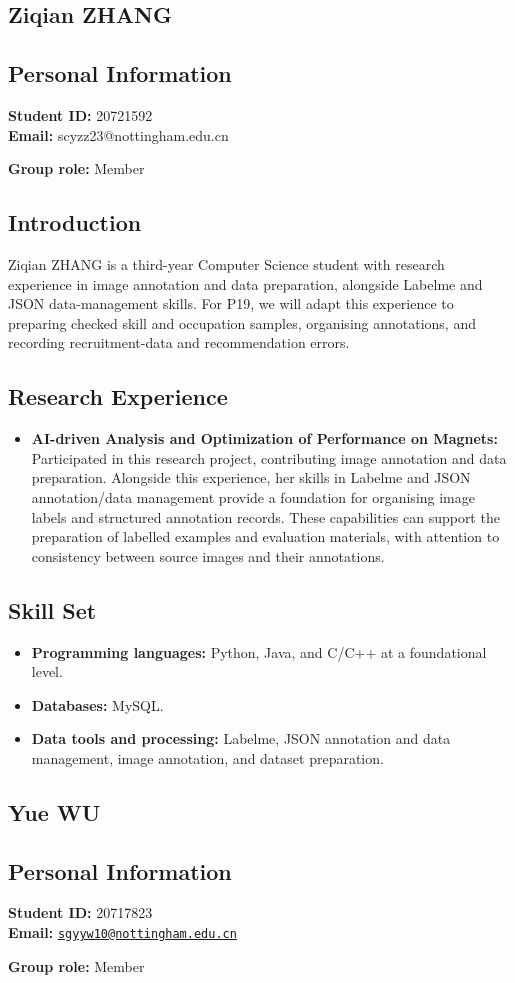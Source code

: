 \documentclass[a4paper,12pt]{article}
\newcommand{\PersonalInformation}[2]{%
  \subsection*{Personal Information}
  \if\relax\detokenize{#1}\relax\else
  \noindent\textbf{Student ID:} #1\\
  \fi
  \textbf{Email:} #2\par
}
\begin{document}
\subsection{Ziqian ZHANG}
\PersonalInformation{20721592}{scyzz23@nottingham.edu.cn}
\noindent\textbf{Group role:} Member\par

\subsection*{Introduction}
Ziqian ZHANG is a third-year Computer Science student with research experience in image annotation and data preparation, alongside Labelme and JSON data-management skills. For P19, we will adapt this experience to preparing checked skill and occupation samples, organising annotations, and recording recruitment-data and recommendation errors.

\subsection*{Research Experience}
\begin{itemize}
  \item \textbf{AI-driven Analysis and Optimization of Performance on Magnets:} Participated in this research project, contributing image annotation and data preparation. Alongside this experience, her skills in Labelme and JSON annotation/data management provide a foundation for organising image labels and structured annotation records. These capabilities can support the preparation of labelled examples and evaluation materials, with attention to consistency between source images and their annotations.
\end{itemize}

\subsection*{Skill Set}
\begin{itemize}
  \item \textbf{Programming languages:} Python, Java, and C/C++ at a foundational level.
  \item \textbf{Databases:} MySQL.
  \item \textbf{Data tools and processing:} Labelme, JSON annotation and data management, image annotation, and dataset preparation.
\end{itemize}

\subsection{Yue WU}
\PersonalInformation{20717823}{\href{mailto:sgyyw10@nottingham.edu.cn}{\nolinkurl{sgyyw10@nottingham.edu.cn}}}
\noindent\textbf{Group role:} Member\par
\end{document}
